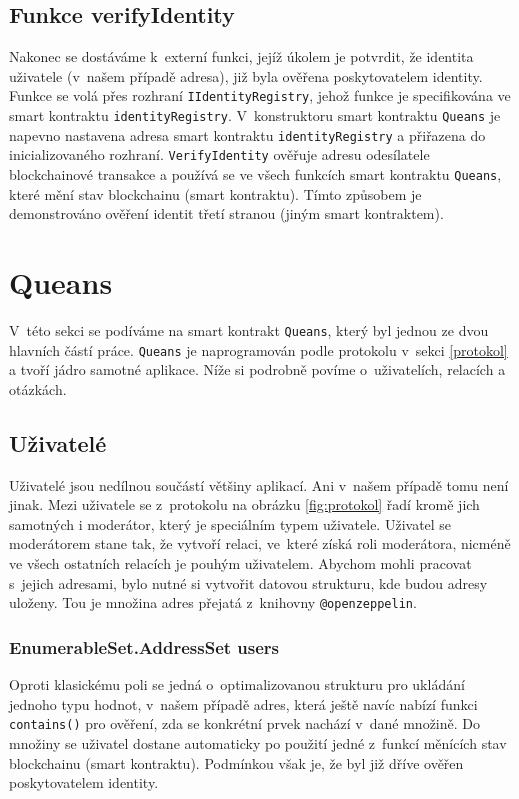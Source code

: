 \subsection{Funkce verifyIdentity}
Nakonec se dostáváme k~externí funkci, jejíž úkolem je potvrdit, že identita uživatele (v~našem případě adresa), již byla ověřena poskytovatelem identity. Funkce se volá přes rozhraní \texttt{IIdentityRegistry}, jehož funkce je specifikována ve smart kontraktu \texttt{identityRegistry}. V~konstruktoru smart kontraktu \texttt{Queans} je napevno nastavena adresa smart kontraktu \texttt{identityRegistry} a přiřazena do inicializovaného rozhraní. \texttt{VerifyIdentity} ověřuje adresu odesílatele blockchainové transakce a používá se ve všech funkcích smart kontraktu \texttt{Queans}, které mění stav blockchainu (smart kontraktu). Tímto způsobem je demonstrováno ověření identit třetí stranou (jiným smart kontraktem).

\section{Queans}
\label{queans}
V~této sekci se podíváme na smart kontrakt \texttt{Queans}, který byl jednou ze dvou hlavních částí práce. \texttt{Queans} je naprogramován podle protokolu v~sekci \ref{protokol} a tvoří jádro samotné aplikace. Níže si podrobně povíme o~uživatelích, relacích a otázkách.

\subsection{Uživatelé}
Uživatelé jsou nedílnou součástí většiny aplikací. Ani v~našem případě tomu není jinak. Mezi uživatele se z~protokolu na obrázku \ref{fig:protokol} řadí kromě jich samotných i moderátor, který je speciálním typem uživatele. Uživatel se moderátorem stane tak, že vytvoří relaci, ve~které získá roli moderátora, nicméně ve všech ostatních relacích je pouhým uživatelem. Abychom mohli pracovat s~jejich adresami, bylo nutné si vytvořit datovou strukturu, kde budou adresy uloženy. Tou je množina adres přejatá z~knihovny \texttt{@openzeppelin}. 

\subsubsection{EnumerableSet.AddressSet users}
Oproti klasickému poli se jedná o~optimalizovanou strukturu pro ukládání jednoho typu hodnot, v~našem případě adres, která ještě navíc nabízí funkci \texttt{contains()} pro ověření, zda se konkrétní prvek nachází v~dané množině. Do množiny se uživatel dostane automaticky po použití jedné z~funkcí měnících stav blockchainu (smart kontraktu). Podmínkou však je, že byl již dříve ověřen poskytovatelem identity. 


